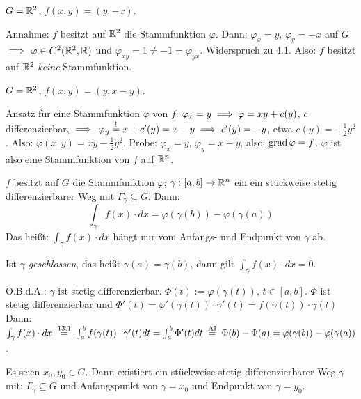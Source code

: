 \documentclass[a4paper,twoside,DIV15,BCOR12mm,chapterprefix=true,headings=twolinechapter]{scrbook}
\begin{document}
\begin{beispiele}
\item $G=\mathbb{R}^2$, $f(x,y) = (y,-x)$.

Annahme: $f$ besitzt auf $\mathbb{R}^2$ die Stammfunktion $\varphi$. Dann: $\varphi_x = y$, $\varphi_y = -x$ auf $G$ $\implies$ $\varphi\in C^2(\mathbb{R}^2,\mathbb{R})$ und $\varphi_{xy} = 1 \ne -1 = \varphi_{yx}$. Widerspruch zu 4.1. Also: $f$ besitzt auf $\mathbb{R}^2$ \emph{keine} Stammfunktion.
\item $G=\mathbb{R}^2$, $f(x,y) = (y,x-y)$.

Ansatz für eine Stammfunktion $\varphi$ von $f$: $\varphi_x=y \implies \varphi=xy+c(y)$, $c$ differenzierbar, $\implies$ $\varphi_y\stackrel{!}{=}x+c'(y) = x-y \implies c'(y) = -y$, etwa $c(y)=-\frac{1}{2}y^2$. Also: $\varphi(x,y) = xy - \frac{1}{2}y^2$. Probe: $\varphi_x=y$, $\varphi_y=x-y$, also: $\mathop{\rm grad}\nolimits\varphi=f$. $\varphi$ ist also eine Stammfunktion von $f$ auf $\mathbb{R}^n$.
\end{beispiele}
\vspace{2em} %
\begin{satz}
$f$ besitzt auf $G$ die Stammfunktion $\varphi$; $\gamma:[a,b]\to\mathbb{R}^n$ ein ein stückweise stetig differenzierbarer Weg mit $\Gamma_\gamma\subseteq G$. Dann:
$$ \int_\gamma f(x)\cdot dx = \varphi\left(\gamma(b)\right) - \varphi\left(\gamma(a)\right) $$
Das heißt: $\int_\gamma f(x)\cdot dx$ hängt nur vom Anfangs- und Endpunkt von $\gamma$ ab.

Ist $\gamma$ \emph{geschlossen}, das heißt $\gamma(a) = \gamma(b)$, dann gilt $\int_\gamma f(x)\cdot dx = 0$.
\end{satz}

\begin{beweis}
O.B.d.A.: $\gamma$ ist stetig differenzierbar. $\Phi(t):= \varphi (\gamma(t))$, $t\in[a,b]$. $\Phi$ ist stetig differenzierbar und $\Phi'(t) = \varphi'(\gamma(t))\cdot \gamma'(t) = f(\gamma(t))\cdot\gamma(t)$ Dann: $\int_\gamma f(x)\cdot dx \gleichnach{13.1} \int_a^bf(\gamma(t))\cdot\gamma'(t)dt = \int_a^b\Phi'(t)dt \gleichnach{AI} \Phi(b)-\Phi(a) = \varphi(\gamma(b))-\varphi(\gamma(a))$.
\end{beweis}

\begin{wichtigerhilfssatz}
Es seien $x_0,y_0\in G$. Dann existiert ein stückweise stetig differenzierbarer Weg $\gamma$ mit: $\Gamma_\gamma\subseteq G$ und Anfangspunkt von $\gamma = x_0$ und Endpunkt von $\gamma=y_0$.
\end{wichtigerhilfssatz}
\end{document}
